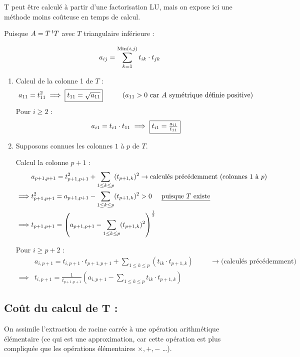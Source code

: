 T peut être calculé à partir d'une factorisation LU, mais on expose ici une méthode moins coûteuse en temps de calcul.

Puisque $A = T \,^tT$ avec $T$ triangulaire inférieure :

\[
    a_{ij} = \sum_{k = 1}^{\operatorname{Min}(i, j)} t_{ik} \cdot t_{jk}
\]

\begin{enumerate}[label=-]
    \item Calcul de la colonne 1 de $T$ :
        \[
            a_{11} = t_{11}^2 \implies \fbox{$t_{11} = \sqrt{a_{11}}$} \hspace{1cm} 
            \text{($a_{11} > 0$ car $A$ symétrique définie positive)}
        \]
        Pour $i \geq 2$ :
        \[
            a_{i1} = t_{i1} \cdot t_{11} \implies \fbox{$t_{i1} = \frac{a_{i1}}{t_{11}}$}
        \]
    \item Supposons connues les colonnes $1$ à $p$ de $T$.

Calcul la colonne $p+1$ :
        \begin{align*}
            & a_{p+1,p+1} = t_{p+1,p+1}^2 + \sum_{1 \leq k \leq p}(t_{p+1,k})^2 \to
            \text{calculés précédemment (colonnes 1 à $p$)} \\
            \implies & t_{p+1,p+1}^2 = a_{p+1,p+1} - \sum_{1 \leq k \leq p}(t_{p+1,k})^2 > 0 \hspace{0.5cm} \text{\underline{puisque $T$ existe}} \\
            \implies & t_{p+1,p+1} = \left(a_{p+1,p+1} - \sum_{1 \leq k \leq p}(t_{p+1,k})^2\right)^{\frac{1}{2}}
        \end{align*}

        Pour $i \geq p+2$ :
        \begin{equation*}
            \begin{split}
                & a_{i,p+1} = t_{i,p+1} \cdot t_{p+1,p+1} + \sum_{1 \leq k \leq p}(t_{ik} \cdot t_{p+1,k})
            \hspace{1cm} \to \text{(calculés précédemment)} \\
                \implies & t_{i,p+1} = \frac{1}{t_{p+1,p+1}} \left ( a_{i,p+1} - \sum_{1 \leq k \leq p} t_{ik} \cdot t_{p+1,k} \right )
            \end{split}
        \end{equation*}

\end{enumerate}

\subsection*{Coût du calcul de T :}
On assimile l'extraction de racine carrée à une opération arithmétique élémentaire (ce qui est
une approximation, car cette opération est plus compliquée que les opérations élémentaires
$\times, +, -$ \dots).

